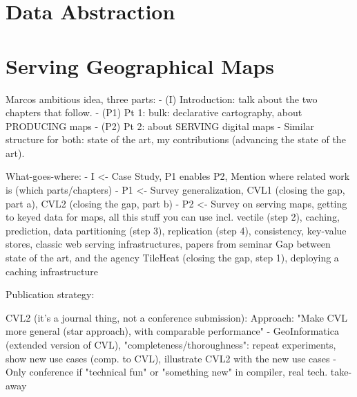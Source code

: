 \documentclass[11pt, oneside]{report}   	%
\begin{document}
\section{Data Abstraction}

\section{Serving Geographical Maps}






Marcos ambitious idea, three parts:
- (I) Introduction: talk about the two chapters that follow. 
- (P1) Pt 1: bulk: declarative cartography, about PRODUCING maps
- (P2) Pt 2: about SERVING digital maps
- Similar structure for both: state of the art, my contributions (advancing the state of the art).  

What-goes-where:
- I <- Case Study, P1 enables P2, Mention where related work is (which parts/chapters)
- P1 <- 
        Survey generalization, 
        CVL1 (closing the gap, part a), 
        CVL2 (closing the gap, part b)
- P2 <- 
        Survey on serving maps, getting to keyed data for maps, all this stuff you can use 
                incl. vectile (step 2),
                caching,
                prediction,
                data partitioning (step 3), 
                replication (step 4), 
                consistency, 
                key-value stores, 
                classic web serving infrastructures,
                papers from seminar
        Gap between state of the art, and the agency
        TileHeat (closing the gap, step 1), deploying a caching infrastructure
        
Publication strategy:

CVL2 (it's a journal thing, not a conference submission):
Approach: "Make CVL more general (star approach), with comparable performance"
- GeoInformatica (extended version of CVL), "completeness/thoroughness": repeat experiments, show new use cases (comp. to CVL), illustrate CVL2 with the new use cases 
- Only conference if "technical fun" or "something new" in compiler, real tech. take-away
\end{document}
